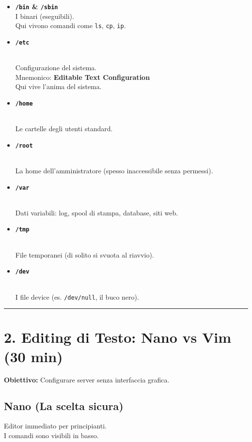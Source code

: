 \documentclass[11pt,a4paper]{article}
\begin{document}
\begin{itemize}
\item
  \textbf{\texttt{/bin} \& \texttt{/sbin}}\\
  I binari (eseguibili).\\
  Qui vivono comandi come \texttt{ls}, \texttt{cp}, \texttt{ip}.
\item
  \textbf{\texttt{/etc}}\strut \\
  Configurazione del sistema.\\
  Mnemonico: \textbf{Editable Text Configuration}\\
  Qui vive l'anima del sistema.
\item
  \textbf{\texttt{/home}}\strut \\
  Le cartelle degli utenti standard.
\item
  \textbf{\texttt{/root}}\strut \\
  La home dell'amministratore (spesso inaccessibile senza permessi).
\item
  \textbf{\texttt{/var}}\strut \\
  Dati variabili: log, spool di stampa, database, siti web.
\item
  \textbf{\texttt{/tmp}}\strut \\
  File temporanei (di solito si svuota al riavvio).
\item
  \textbf{\texttt{/dev}}\strut \\
  I file device (es. \texttt{/dev/null}, il buco nero).
\end{itemize}

\begin{center}\rule{0.5\linewidth}{0.5pt}\end{center}

\section{2. Editing di Testo: Nano vs Vim (30
min)}\label{editing-di-testo-nano-vs-vim-30-min}

\textbf{Obiettivo:} Configurare server senza interfaccia grafica.

\subsection{Nano (La scelta sicura)}\label{nano-la-scelta-sicura}

Editor immediato per principianti.\\
I comandi sono visibili in basso.
\end{document}
